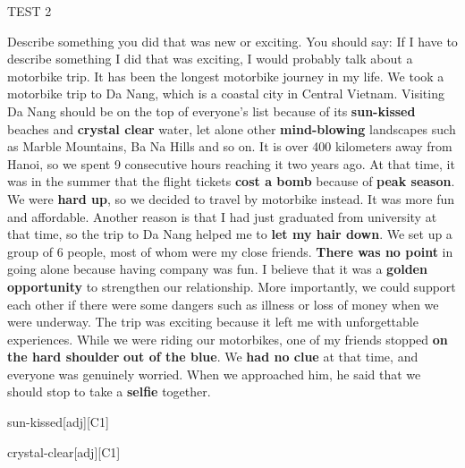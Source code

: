 \begin{glossarymc}[Cambridge 9]
\begin{test}{TEST 2}
\begin{qa}{Describe something you did that was new or exciting. You should say:}
    If I have to describe something I did that was exciting, I would probably talk about a motorbike trip. It has been the longest motorbike journey in my life. We took a motorbike trip to Da Nang, which is a coastal city in Central Vietnam. Visiting Da Nang should be on the top of everyone's list because of its \textbf{sun-kissed} beaches and \textbf{crystal clear} water, let alone other \textbf{mind-blowing} landscapes such as Marble Mountains, Ba Na Hills and so on. It is over 400 kilometers away from Hanoi, so we spent 9 consecutive hours reaching it two years ago. At that time, it was in the summer that the flight tickets \textbf{cost a bomb} because of \textbf{peak season}. We were \textbf{hard up}, so we decided to travel by motorbike instead. It was more fun and affordable. Another reason is that I had just graduated from university at that time, so the trip to Da Nang helped me to \textbf{let my hair down}. We set up a group of 6 people, most of whom were my close friends. \textbf{There was no point} in going alone because having company was fun. I believe that it was a \textbf{golden opportunity} to strengthen our relationship. More importantly, we could support each other if there were some dangers such as illness or loss of money when we were underway. The trip was exciting because it left me with unforgettable experiences. While we were riding our motorbikes, one of my friends stopped \textbf{on the hard shoulder} \textbf{out of the blue}. We \textbf{had no clue} at that time, and everyone was genuinely worried. When we approached him, he said that we should stop to take a \textbf{selfie} together.
    \end{qa}

        \begin{VocabExplain}[Part 2]
            \begin{ExplainCard}{sun-kissed}[adj][C1]
            \end{ExplainCard}

            \begin{ExplainCard}{crystal-clear}[adj][C1]
            \end{ExplainCard}


\end{VocabExplain}
\end{test}
\end{glossarymc}
